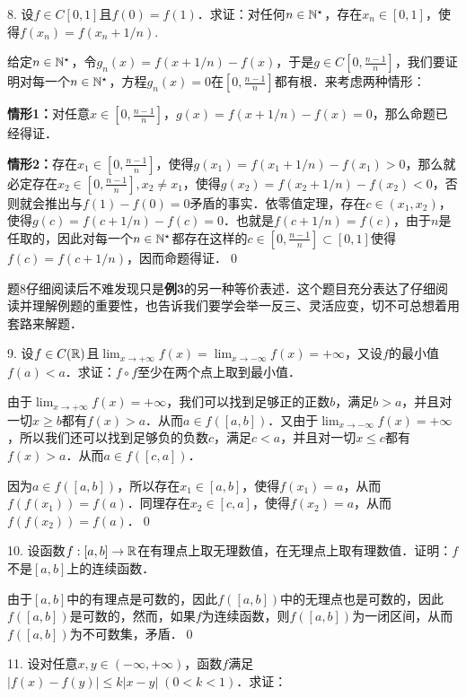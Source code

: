 8. 设$f \in C[0,1]$且$f(0)=f(1)$．求证：对任何$n \in \mathbb{N}^\star$，存在$x_n \in [0,1]$，使得$f(x_n) = f(x_n + 1/n)$.

\prove 给定$n \in \mathbb{N}^\star$，令$g_n(x) = f(x + 1/n) - f(x)$，于是$g \in C[0,\displaystyle\frac{n-1}{n}]$，我们要证明对每一个$n \in \mathbb{N}^\star$，方程$g_n(x) = 0$在$[0,\displaystyle\frac{n-1}{n}]$都有根．来考虑两种情形：

\textbf{情形1：}对任意$x \in [0, \displaystyle\frac{n-1}{n}]$，$g(x) = f(x+1/n)-f(x)=0$，那么命题已经得证．

\textbf{情形2：}存在$x_1 \in [0, \displaystyle\frac{n-1}{n}]$，使得$g(x_1) = f(x_1+1/n)-f(x_1)>0$，那么就必定存在$x_2 \in [0, \displaystyle\frac{n-1}{n}], x_2 \neq x_1$，使得$g(x_2) = f(x_2+1/n)-f(x_2)<0$，否则就会推出与$f(1)-f(0)=0$矛盾的事实．依零值定理，存在$c \in (x_1,x_2)$，使得$g(c)=f(c+1/n)-f(c)=0$．也就是$f(c+1/n)=f(c)$，由于$n$是任取的，因此对每一个$n \in \mathbb{N}^\star$都存在这样的$c \in [0,\displaystyle\frac{n-1}{n}]\subset[0,1]$使得$f(c)=f(c+1/n)$，因而命题得证．\qed\bigskip

\annotate 题8仔细阅读后不难发现只是\textbf{例3}的另一种等价表述．这个题目充分表达了仔细阅读并理解例题的重要性，也告诉我们要学会举一反三、灵活应变，切不可总想着用套路来解题．\bigskip

9. 设$f \in C(\mathbb{R})$且$\displaystyle\lim_{x \to +\infty}f(x) = \displaystyle\lim_{x \to -\infty}f(x) = +\infty$，又设$f$的最小值$f(a)<a$．求证：$f \circ f$至少在两个点上取到最小值．

\prove 由于$\displaystyle\lim_{x \to +\infty} f(x) = +\infty$，我们可以找到足够正的正数$b$，满足$b > a$，并且对一切$x \geq b$都有$f(x) > a$．从而$a \in f([a,b])$．又由于$\displaystyle\lim_{x \to -\infty}f(x) = +\infty$，所以我们还可以找到足够负的负数$c$，满足$c < a$，并且对一切$x \leq c$都有$f(x) > a$．从而$a \in f([c,a])$．

因为$a \in f([a,b])$，所以存在$x_1 \in [a,b]$，使得$f(x_1) = a$，从而$f(f(x_1))=f(a)$．同理存在$x_2 \in [c,a]$，使得$f(x_2) = a$，从而$f(f(x_2))=f(a)$．\qed\bigskip

10. 设函数$f: [a,b] \to \mathbb{R}$在有理点上取无理数值，在无理点上取有理数值．证明：$f$不是$[a,b]$上的连续函数．

\prove 由于$[a,b]$中的有理点是可数的，因此$f([a,b])$中的无理点也是可数的，因此$f([a,b])$是可数的，然而，如果$f$为连续函数，则$f([a,b])$为一闭区间，从而$f([a,b])$为不可数集，矛盾．\qed\bigskip

11. 设对任意$x,y \in (-\infty, +\infty)$，函数$f$满足$\lvert f(x) - f(y) \rvert \leq k \lvert x - y \rvert \; (0 < k < 1)$．求证：


